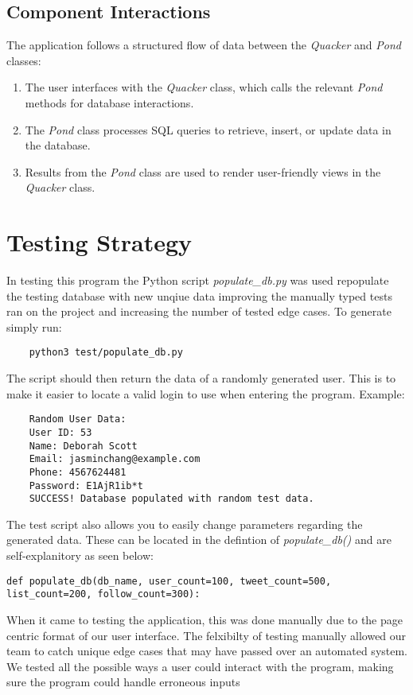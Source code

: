 \documentclass[letterpaper, 11pt]{article}
\begin{document}
	\subsection*{Component Interactions}
	The application follows a structured flow of data between the \textit{Quacker} and \textit{Pond} classes:
	\begin{enumerate}
		\item The user interfaces with the \textit{Quacker} class, which calls the relevant \textit{Pond} methods for database interactions.
		\item The \textit{Pond} class processes SQL queries to retrieve, insert, or update data in the database.
		\item Results from the \textit{Pond} class are used to render user-friendly views in the \textit{Quacker} class.
	\end{enumerate}


\section{Testing Strategy}
In testing this program the Python script \textit{populate\_db.py} was used repopulate the testing database with 
new unqiue data improving the manually typed tests ran on the project and increasing the number of tested edge 
cases. To generate simply run:
\begin{verbatim}
	python3 test/populate_db.py
\end{verbatim}
The script should then return the data of a randomly generated user. This is to make it easier to locate a valid
login to use when entering the program. Example: 
\begin{verbatim}
	Random User Data:
	User ID: 53
	Name: Deborah Scott
	Email: jasminchang@example.com
	Phone: 4567624481
	Password: E1AjR1ib*t
	SUCCESS! Database populated with random test data.
\end{verbatim}
The test script also allows you to easily change parameters regarding the generated data. These can be located in the
defintion of \textit{populate\_db()} and are self-explanitory as seen below:
\begin{lstlisting}
def populate_db(db_name, user_count=100, tweet_count=500, list_count=200, follow_count=300):
\end{lstlisting}
When it came to testing the application, this was done manually due to the page centric format of our user interface. 
The felxibilty of testing manually allowed our team to catch unique edge cases that may have passed over an automated
system. \\We tested all the possible ways a user could interact with the program, making sure the program could handle erroneous inputs
\end{document}
